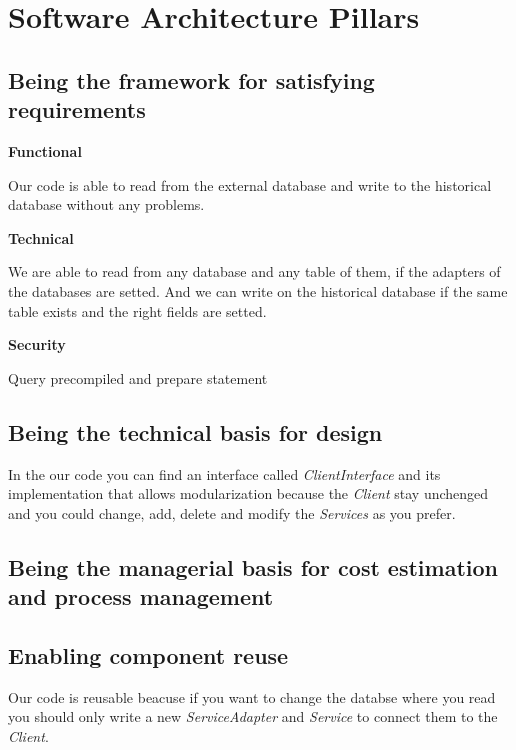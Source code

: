 \section{Software Architecture Pillars}

\subsection{Being the framework for satisfying requirements}

\textbf{Functional}

Our code is able to read from the external database and write to the historical database without any problems.

\textbf{Technical}

We are able to read from any database and any table of them, if the adapters of the databases are setted. And we can write on the historical database if the same table exists and the right fields are setted.

\textbf{Security}

Query precompiled and prepare statement

\subsection{Being the technical basis for design}


In the our code you can find an interface called \textit{ClientInterface} and its implementation that allows modularization because the \textit{Client} stay unchenged and you could change, add, delete and modify the \textit{Services} as you prefer.

\subsection{Being the managerial basis for cost estimation and process management}

\subsection{Enabling component reuse}


Our code is reusable beacuse if you want to change the databse where you read you should only write a new \textit{ServiceAdapter} and \textit{Service} to connect them to the \textit{Client}.

